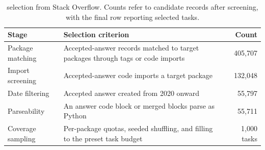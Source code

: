 \begin{table}[!htbp]
\centering\footnotesize
\caption{\myso selection from Stack Overflow.
Counts refer to candidate records after screening, with the final row reporting selected tasks.}
\label{tab:pintrace_selection}
\setlength{\tabcolsep}{3pt}
\renewcommand{\arraystretch}{1.15}
\begin{tabularx}{\linewidth}{@{}l >{\raggedright\arraybackslash}X r@{}}
\toprule
\textbf{Stage} & \textbf{Selection criterion} & \textbf{Count} \\
\midrule
Package matching & Accepted-answer records matched to target packages through tags or code imports & 405,707 \\
Import screening & Accepted-answer code imports a target package & 132,048 \\
Date filtering & Accepted answer created from 2020 onward & 55,797 \\
Parseability & An answer code block or merged blocks parse as Python & 55,711 \\
Coverage sampling & Per-package quotas, seeded shuffling, and filling to the preset task budget & 1,000 tasks \\
\bottomrule
\end{tabularx}
\end{table}
